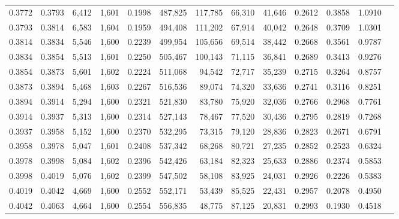 \begin{tabular}{rrrrrrrrrrrrr}
0.3772 & 0.3793 &  6,412 & 1,601 &                                     0.1998 & 487,825 & 117,785 &  66,310 &  41,646 & 0.2612 & 0.3858 & 1.0910 \\
0.3793 & 0.3814 &  6,583 & 1,604 &                                     0.1959 & 494,408 & 111,202 &  67,914 &  40,042 & 0.2648 & 0.3709 & 1.0301 \\
0.3814 & 0.3834 &  5,546 & 1,600 &                                     0.2239 & 499,954 & 105,656 &  69,514 &  38,442 & 0.2668 & 0.3561 & 0.9787 \\
0.3834 & 0.3854 &  5,513 & 1,601 &                                     0.2250 & 505,467 & 100,143 &  71,115 &  36,841 & 0.2689 & 0.3413 & 0.9276 \\
0.3854 & 0.3873 &  5,601 & 1,602 &                                     0.2224 & 511,068 &  94,542 &  72,717 &  35,239 & 0.2715 & 0.3264 & 0.8757 \\
0.3873 & 0.3894 &  5,468 & 1,603 &                                     0.2267 & 516,536 &  89,074 &  74,320 &  33,636 & 0.2741 & 0.3116 & 0.8251 \\
0.3894 & 0.3914 &  5,294 & 1,600 &                                     0.2321 & 521,830 &  83,780 &  75,920 &  32,036 & 0.2766 & 0.2968 & 0.7761 \\
0.3914 & 0.3937 &  5,313 & 1,600 &                                     0.2314 & 527,143 &  78,467 &  77,520 &  30,436 & 0.2795 & 0.2819 & 0.7268 \\
0.3937 & 0.3958 &  5,152 & 1,600 &                                     0.2370 & 532,295 &  73,315 &  79,120 &  28,836 & 0.2823 & 0.2671 & 0.6791 \\
0.3958 & 0.3978 &  5,047 & 1,601 &                                     0.2408 & 537,342 &  68,268 &  80,721 &  27,235 & 0.2852 & 0.2523 & 0.6324 \\
0.3978 & 0.3998 &  5,084 & 1,602 &                                     0.2396 & 542,426 &  63,184 &  82,323 &  25,633 & 0.2886 & 0.2374 & 0.5853 \\
0.3998 & 0.4019 &  5,076 & 1,602 &                                     0.2399 & 547,502 &  58,108 &  83,925 &  24,031 & 0.2926 & 0.2226 & 0.5383 \\
0.4019 & 0.4042 &  4,669 & 1,600 &                                     0.2552 & 552,171 &  53,439 &  85,525 &  22,431 & 0.2957 & 0.2078 & 0.4950 \\
0.4042 & 0.4063 &  4,664 & 1,600 &                                     0.2554 & 556,835 &  48,775 &  87,125 &  20,831 & 0.2993 & 0.1930 & 0.4518 \\

\end{tabular}
